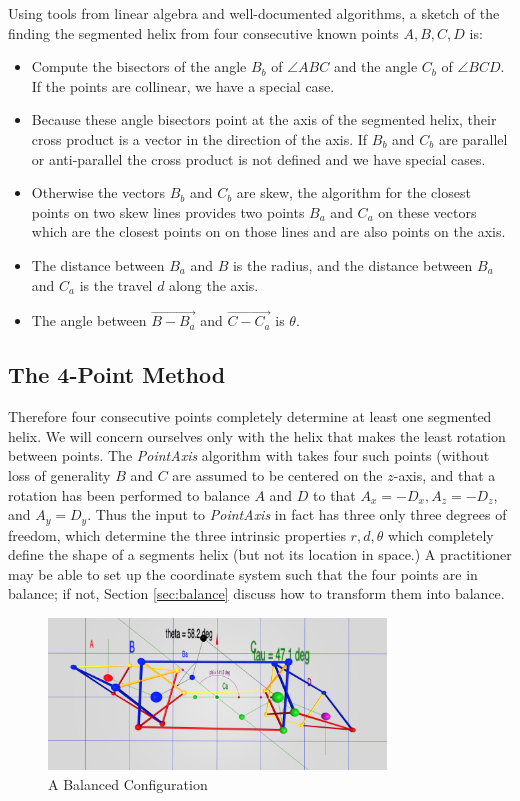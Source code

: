 \documentclass[11pt]{article}
\begin{document}
{Using tools from linear algebra and well-documented algorithms, a sketch of the finding the segmented helix from
four consecutive known points $A,B,C,D$ is:
\begin{itemize}
\item Compute the bisectors of the angle $B_b$ of $ \angle{ABC}$ and the angle $C_b$ of $\angle{BCD}$.
  If the points are collinear, we have a special case.
\item Because these angle bisectors point at the axis of the segmented helix, their cross product is a vector
  in the direction of the axis. If $B_b$ and $C_b$ are parallel or anti-parallel the cross product is not defined
  and we have special cases.
\item  Otherwise the vectors $B_b$ and $C_b$ are skew, the algorithm for the closest points on
  two skew lines provides two points $B_a$ and $C_a$ on these vectors which
  are the closest points on on those lines and are also points on the axis.
\item The distance between $B_a$ and $B$ is the radius, and the distance between $B_a$ and $C_a$ is the travel $d$ along the axis.
  \item The angle between $\overrightarrow{B - B_a}$ and $\overrightarrow{C - C_a}$ is $\theta$.
  \end{itemize}


\subsection{The 4-Point Method}

Therefore four consecutive points completely determine at least one segmented helix. We will concern ourselves
only with the helix that makes the least rotation between points.
The {\em PointAxis} algorithm
with takes four such points (without loss of generality $B$ and $C$ are assumed to be centered on the $z$-axis, and that a
rotation has been performed to balance $A$ and $D$ to that $A_x = -D_x, A_z = -D_z$, and $A_y = D_y$. Thus the input to
{\em PointAxis} in fact has three only three degrees of freedom, which determine the three intrinsic properties $r,d,\theta$
which completely define the shape of a segments helix (but not its location in space.) A practitioner may be able to set up
the coordinate system such that the four points are in balance;
if not, Section \ref{sec:balance} discuss how to transform them
into balance.

\begin{figure}
     \centering
     \includegraphics[width=0.80\textwidth]{figures/Balance.png}
     \caption{A Balanced Configuration}
  \label{fig:balancediagram}
\end{figure}

}
\end{document}
